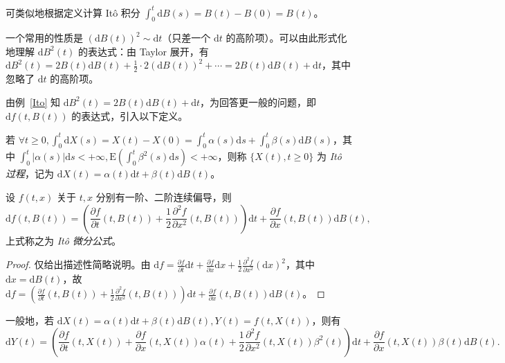 \documentclass[../main.tex]{subfiles}
\begin{document}
可类似地根据定义计算 It\^o 积分 $\int_0^t\mathrm dB(s)=B(t)-B(0)=B(t)$。

一个常用的性质是 $(\mathrm dB(t))^2\sim\mathrm dt$（只差一个 $\mathrm dt$ 的高阶项）。可以由此形式化地理解 $\mathrm dB^2(t)$ 的表达式：由 Taylor 展开，有 $\mathrm dB^2(t)=2B(t)\mathrm dB(t)+\frac12\cdot2(\mathrm dB(t))^2+\cdots=2B(t)\mathrm dB(t)+\mathrm dt$，其中忽略了 $\mathrm dt$ 的高阶项。

由例~\ref{Ito} 知 $\mathrm dB^2(t)=2B(t)\mathrm dB(t)+\mathrm dt$，为回答更一般的问题，即 $\mathrm df(t,B(t))$ 的表达式，引入以下定义。

\begin{definition}\label{def:8.5.3}
    若 $\forall t\geq0,\int_0^t\mathrm dX(s)=X(t)-X(0)=\int_0^t\alpha(s)\mathrm ds+\int_0^t\beta(s)\mathrm dB(s)$，其中 $\int_0^t|\alpha(s)|\mathrm ds<+\infty,\mathrm E(\int_0^t\beta^2(s)\mathrm ds)<+\infty$，则称 $\{X(t),t\geq0\}$ 为 \emph{It\^o 过程}，记为 $\mathrm dX(t)=\alpha(t)\mathrm dt+\beta(t)\mathrm dB(t)$。
\end{definition}

\begin{theorem}\label{thm:8.5.1}
    设 $f(t,x)$ 关于 $t,x$ 分别有一阶、二阶连续偏导，则
    \begin{equation*}
        \mathrm df(t,B(t))=\left(\frac{\partial f}{\partial t}(t,B(t))+\frac12\frac{\partial^2f}{\partial x^2}(t,B(t))\right)\mathrm dt+\frac{\partial f}{\partial x}(t,B(t))\mathrm dB(t),
    \end{equation*}
    上式称之为 \emph{It\^o 微分公式}。
\end{theorem}

\begin{proof}
    仅给出描述性简略说明。由 $\mathrm df=\frac{\partial f}{\partial t}\mathrm dt+\frac{\partial f}{\partial x}\mathrm dx+\frac12\frac{\partial^2f}{\partial x^2}(\mathrm dx)^2$，其中 $\mathrm dx=\mathrm dB(t)$，故 $\mathrm df=\left(\frac{\partial f}{\partial t}(t,B(t))+\frac12\frac{\partial^2f}{\partial x^2}(t,B(t))\right)\mathrm dt+\frac{\partial f}{\partial x}(t,B(t))\mathrm dB(t)$。
\end{proof}

一般地，若 $\mathrm dX(t)=\alpha(t)\mathrm dt+\beta(t)\mathrm dB(t),Y(t)=f(t,X(t))$，则有
\begin{equation*}
    \mathrm dY(t)=\left(\frac{\partial f}{\partial t}(t,X(t))+\frac{\partial f}{\partial x}(t,X(t))\alpha(t)+\frac12\frac{\partial^2f}{\partial x^2}(t,X(t))\beta^2(t)\right)\mathrm dt+\frac{\partial f}{\partial x}(t,X(t))\beta(t)\mathrm dB(t).
\end{equation*}
\end{document}
